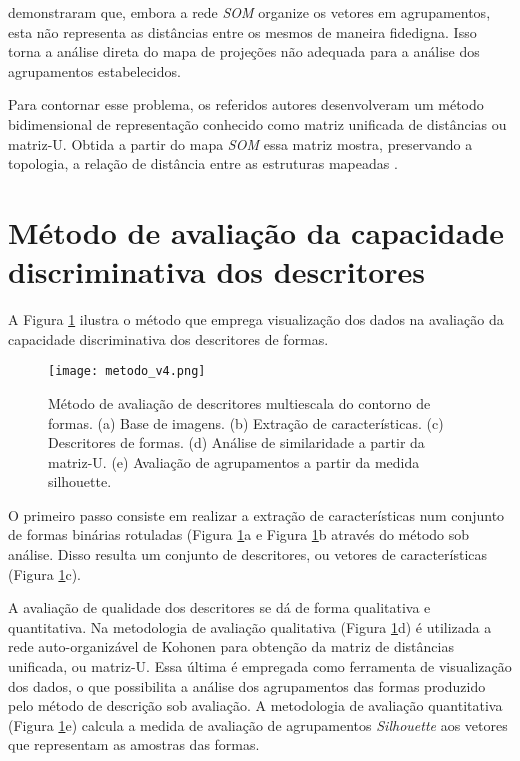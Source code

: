  demonstraram que, embora a rede \emph{SOM} organize os vetores em agrupamentos, esta não representa as distâncias entre os mesmos de maneira fidedigna. Isso torna a análise direta do mapa de projeções não adequada para a análise dos agrupamentos estabelecidos. 

Para contornar esse problema, os referidos autores desenvolveram um método bidimensional de representação conhecido como matriz unificada de distâncias ou matriz-U. Obtida a partir do mapa \emph{SOM} essa matriz mostra, preservando a topologia, a relação de distância entre as estruturas mapeadas \cite{Ultsch:1990}. 

\section{Método de avaliação da capacidade discriminativa dos descritores}

A Figura \ref{fig:metodo_4} ilustra o método que emprega visualização dos dados na avaliação da capacidade discriminativa dos descritores de formas.

\begin{figure}[h!]
  \caption{\label{fig:metodo_4} Método de avaliação de descritores multiescala do contorno de formas. (a) Base de imagens. (b) Extração de características. (c) Descritores de formas. (d) Análise de similaridade a partir da matriz-U. (e) Avaliação de agrupamentos a partir da medida silhouette.}
  \centering
  \texttt{[image: metodo\_v4.png]}
\end{figure}

O primeiro passo consiste em realizar a extração de características num conjunto de formas binárias rotuladas (Figura \ref{fig:metodo_4}a e Figura \ref{fig:metodo_4}b através do método sob análise. Disso resulta um conjunto de descritores, ou vetores de características (Figura \ref{fig:metodo_4}c). 

A avaliação de qualidade dos descritores se dá de forma qualitativa e quantitativa. Na metodologia de avaliação qualitativa (Figura \ref{fig:metodo_4}d) é utilizada a rede auto-organizável de Kohonen para obtenção da matriz de distâncias unificada, ou matriz-U. Essa última é empregada como ferramenta de visualização dos dados, o que possibilita a análise dos agrupamentos das formas produzido pelo método de descrição sob avaliação. A metodologia de avaliação quantitativa (Figura \ref{fig:metodo_4}e) calcula a medida de avaliação de agrupamentos \emph{Silhouette} aos vetores que representam as amostras das formas.

